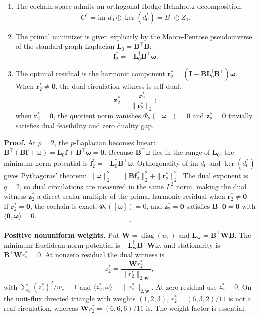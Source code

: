 \documentclass[
]{article}
\providecommand{\tightlist}{%
  \setlength{\itemsep}{0pt}\setlength{\parskip}{0pt}}
\providecommand{\tightlist}{%
  \setlength{\itemsep}{0pt}\setlength{\parskip}{0pt}}
\begin{document}
\begin{enumerate}
\def\labelenumi{\arabic{enumi}.}
\tightlist
\item
  The cochain space admits an orthogonal Hodge-Helmholtz decomposition:
  \[C^1 = \text{im } d_0 \oplus \ker(d_0^*) = B^1 \oplus Z_1.\]
\item
  The primal minimizer is given explicitly by the Moore-Penrose pseudoinverse of the standard graph Laplacian \(\mathbf{L}_0 = \mathbf{B}^\top \mathbf{B}\):
  \[\mathbf{f}_2^* = -\mathbf{L}_0^\dagger \mathbf{B}^\top \boldsymbol{\omega}.\]
\item
  The optimal residual is the harmonic component \(\mathbf{r}_2^* = (\mathbf{I} - \mathbf{B}\mathbf{L}_0^\dagger \mathbf{B}^\top)\boldsymbol{\omega}\). When \(\mathbf{r}_2^* \ne \mathbf{0}\), the dual circulation witness is self-dual:
  \[\mathbf{z}_2^* = \frac{\mathbf{r}_2^*}{\|\mathbf{r}_2^*\|_2};\]
  when \(\mathbf{r}_2^* = \mathbf{0}\), the quotient norm vanishes \(\Phi_2([\boldsymbol{\omega}]) = 0\) and \(\mathbf{z}_2^* = \mathbf{0}\) trivially satisfies dual feasibility and zero duality gap.
\end{enumerate}

\textbf{Proof.} At \(p = 2\), the \(p\)-Laplacian becomes linear: \(\mathbf{B}^\top(\mathbf{B}\mathbf{f} + \boldsymbol{\omega}) = \mathbf{L}_0 \mathbf{f} + \mathbf{B}^\top \boldsymbol{\omega} = \mathbf{0}\).
Because \(\mathbf{B}^\top \boldsymbol{\omega}\) lies in the range of \(\mathbf{L}_0\), the minimum-norm potential is \(\mathbf{f}_2^* = -\mathbf{L}_0^\dagger \mathbf{B}^\top \boldsymbol{\omega}\).
Orthogonality of \(\text{im } d_0\) and \(\ker(d_0^*)\) gives Pythagoras' theorem: \(\|\boldsymbol{\omega}\|_2^2 = \|\mathbf{B}\mathbf{f}_2^*\|_2^2 + \|\mathbf{r}_2^*\|_2^2\).
The dual exponent is \(q = 2\), so dual circulations are measured in the same \(L^2\) norm, making the dual witness \(\mathbf{z}_2^*\) a direct scalar multiple of the primal harmonic residual when \(\mathbf{r}_2^* \ne \mathbf{0}\). If \(\mathbf{r}_2^* = \mathbf{0}\), the cochain is exact, \(\Phi_2([\boldsymbol{\omega}]) = 0\), and \(\mathbf{z}_2^* = \mathbf{0}\) satisfies \(\mathbf{B}^\top \mathbf{0} = \mathbf{0}\) with \(\langle \mathbf{0}, \boldsymbol{\omega} \rangle = 0\). \[\square\]

\textbf{Positive nonuniform weights.} Put \(\mathbf{W}=\operatorname{diag}(w_e)\) and \(\mathbf{L}_{\mathbf{w}}=\mathbf{B}^\top\mathbf{W}\mathbf{B}\). The minimum Euclidean-norm potential is \(-\mathbf{L}_{\mathbf{w}}^\dagger\mathbf{B}^\top\mathbf{W}\omega\), and stationarity is \(\mathbf{B}^\top\mathbf{W}r_2^*=0\). At nonzero residual the dual witness is
\[z_2^*=\frac{\mathbf{W}r_2^*}{\|r_2^*\|_{2,\mathbf{w}}},\]
with \(\sum_e (z_e^*)^2/w_e=1\) and \(\langle z_2^*,\omega\rangle=\|r_2^*\|_{2,\mathbf{w}}\). At zero residual use \(z_2^*=0\). On the unit-flux directed triangle with weights \((1,2,3)\), \(r_2^*=(6,3,2)/11\) is not a real circulation, whereas \(\mathbf{W}r_2^*=(6,6,6)/11\) is. The weight factor is essential.
\end{document}
